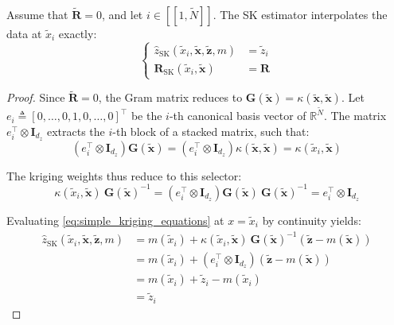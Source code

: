 \begin{proposition}\label{th:noiseless_kriging}
	Assume that $\tilde{\mathbf{R}}=0$, and let $i\in[\![1,\tilde{N}]\!]$. The SK estimator interpolates the data at $\tilde{x}_i$ exactly:
	\begin{equation}
		\left\{\begin{aligned}
		\hat{z}_{\mathrm{SK}}(\tilde{x}_i,\tilde{\mathbf{x}},\tilde{\mathbf{z}},m)&=\tilde{z}_i\\
		\mathbf{R}_{\mathrm{SK}}(\tilde{x}_i,\tilde{\mathbf{x}})&=\mathbf{R}
		\end{aligned}\right.
	\end{equation}
\end{proposition}

\begin{proof}
	Since $\tilde{\mathbf{R}}=0$, the Gram matrix reduces to $\mathbf{G}(\tilde{\mathbf{x}})=\kappa(\tilde{\mathbf{x}},\tilde{\mathbf{x}})$. Let $e_i\triangleq[0,\dots,0,1,0,\dots,0]^\top$ be the $i$-th canonical basis vector of $\mathbb{R}^{\tilde{N}}$. The matrix $e_i^\top\otimes \mathbf{I}_{d_z}$ extracts the $i$-th block of a stacked matrix, such that:
	\begin{equation}
		\left(e_i^\top\otimes \mathbf{I}_{d_z}\right)\mathbf{G}(\tilde{\mathbf{x}})=\left(e_i^\top\otimes \mathbf{I}_{d_z}\right)\kappa(\tilde{\mathbf{x}},\tilde{\mathbf{x}})=\kappa(\tilde{x}_i,\tilde{\mathbf{x}})
	\end{equation}

	The kriging weights thus reduce to this selector:
	\begin{equation}
		\kappa(\tilde{x}_i,\tilde{\mathbf{x}})\:\mathbf{G}(\tilde{\mathbf{x}})^{-1}=\left(e_i^\top\otimes \mathbf{I}_{d_z}\right)\mathbf{G}(\tilde{\mathbf{x}})\:\mathbf{G}(\tilde{\mathbf{x}})^{-1}=e_i^\top\otimes \mathbf{I}_{d_z}
	\end{equation}

	Evaluating \eqref{eq:simple_kriging_equations} at $x=\tilde{x}_i$ by continuity yields:
	\begin{equation}
		\begin{aligned}
			\hat{z}_{\mathrm{SK}}(\tilde{x}_i,\tilde{\mathbf{x}},\tilde{\mathbf{z}},m)&=m(\tilde{x}_i)+\kappa(\tilde{x}_i,\tilde{\mathbf{x}})\:\mathbf{G}(\tilde{\mathbf{x}})^{-1}\left(\tilde{\mathbf{z}}-m(\tilde{\mathbf{x}})\right)\\
			&=m(\tilde{x}_i)+\left(e_i^\top\otimes \mathbf{I}_{d_z}\right)\left(\tilde{\mathbf{z}}-m(\tilde{\mathbf{x}})\right)\\
			&=m(\tilde{x}_i)+\tilde{z}_i-m(\tilde{x}_i)\\
			&=\tilde{z}_i
		\end{aligned}
	\end{equation}


\end{proof}
